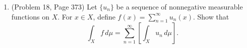 \documentclass{article}%
\begin{document}
\begin{enumerate}
\item (Problem 18, Page 373)  Let $\{u_n\}$ be a sequence of nonnegative measurable functions on $X$.  For $x\in X$, define $f(x) = \sum_{n=1}^{\infty} u_n(x)$.  Show that \[
\int_X f \, d\mu = \sum_{n=1}^{\infty} \left[\int_X u_n \, d\mu \right].\]




\end{enumerate}
\end{document}
